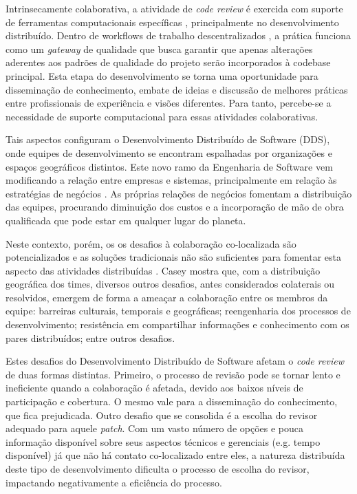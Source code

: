 \documentclass[a4paper,12pt]{monografia}
\theoremstyle{plain}
\theoremstyle{definition}
\theoremstyle{remark}
\begin{document}
Intrinsecamente colaborativa, a atividade de \textit{code review} é exercida com suporte de ferramentas computacionais específicas \cite{Bacchelli2013}, principalmente no desenvolvimento distribuído. Dentro de workflows de trabalho descentralizados \cite{gousios2016}, a prática funciona como um \textit{gateway} de qualidade que busca garantir que apenas alterações aderentes aos padrões de qualidade do projeto serão incorporados à codebase principal. Esta etapa do desenvolvimento se torna uma oportunidade para disseminação de conhecimento, embate de ideias e discussão de melhores práticas entre profissionais de experiência e visões diferentes. Para tanto, percebe-se a necessidade de suporte computacional para essas atividades colaborativas.

Tais aspectos configuram o Desenvolvimento Distribuído de Software (DDS), onde equipes de desenvolvimento se encontram espalhadas por organizações e espaços geográficos distintos. Este novo ramo da Engenharia de Software vem modificando a relação entre empresas e sistemas, principalmente em relação às estratégias de negócios \cite{audy2007}. As próprias relações de negócios fomentam a distribuição das equipes, procurando diminuição dos custos e a incorporação de mão de obra qualificada que pode estar em qualquer lugar do planeta.

Neste contexto, porém, os os desafios à colaboração co-localizada são potencializados e as soluções tradicionais não são suficientes para fomentar esta aspecto das atividades distribuídas \cite{nicolaci2011}. Casey \cite{casey2010} mostra que, com a distribuição geográfica dos times, diversos outros desafios, antes considerados colaterais ou resolvidos, emergem de forma a ameaçar a colaboração entre os membros da equipe: barreiras culturais, temporais e geográficas; reengenharia dos processos de desenvolvimento; resistência em compartilhar informações e conhecimento com os pares distribuídos; entre outros desafios.

Estes desafios do Desenvolvimento Distribuído de Software afetam o \textit{code review} de duas formas distintas. Primeiro, o processo de revisão pode se tornar lento e ineficiente quando a colaboração é afetada, devido aos baixos níveis de participação e cobertura. O mesmo vale para a disseminação do conhecimento, que fica prejudicada. Outro desafio que se consolida é a escolha do revisor adequado para aquele \textit{patch}. Com um vasto número de opções e pouca informação disponível sobre seus aspectos técnicos e gerenciais (e.g. tempo disponível) já que não há contato co-localizado entre eles, a natureza distribuída deste tipo de desenvolvimento dificulta o processo de escolha do revisor, impactando negativamente a eficiência do processo.
\end{document}
